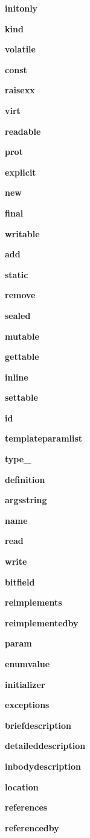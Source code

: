 \begin{DoxyCompactItemize}
\item 
{\bf initonly}
\item 
{\bf kind}
\item 
{\bf volatile}
\item 
{\bf const}
\item 
{\bf raisexx}
\item 
{\bf virt}
\item 
{\bf readable}
\item 
{\bf prot}
\item 
{\bf explicit}
\item 
{\bf new}
\item 
{\bf final}
\item 
{\bf writable}
\item 
{\bf add}
\item 
{\bf static}
\item 
{\bf remove}
\item 
{\bf sealed}
\item 
{\bf mutable}
\item 
{\bf gettable}
\item 
{\bf inline}
\item 
{\bf settable}
\item 
{\bf id}
\item 
{\bf templateparamlist}
\item 
{\bf type\+\_\+}
\item 
{\bf definition}
\item 
{\bf argsstring}
\item 
{\bf name}
\item 
{\bf read}
\item 
{\bf write}
\item 
{\bf bitfield}
\item 
{\bf reimplements}
\item 
{\bf reimplementedby}
\item 
{\bf param}
\item 
{\bf enumvalue}
\item 
{\bf initializer}
\item 
{\bf exceptions}
\item 
{\bf briefdescription}
\item 
{\bf detaileddescription}
\item 
{\bf inbodydescription}
\item 
{\bf location}
\item 
{\bf references}
\item 
{\bf referencedby}
\end{DoxyCompactItemize}
